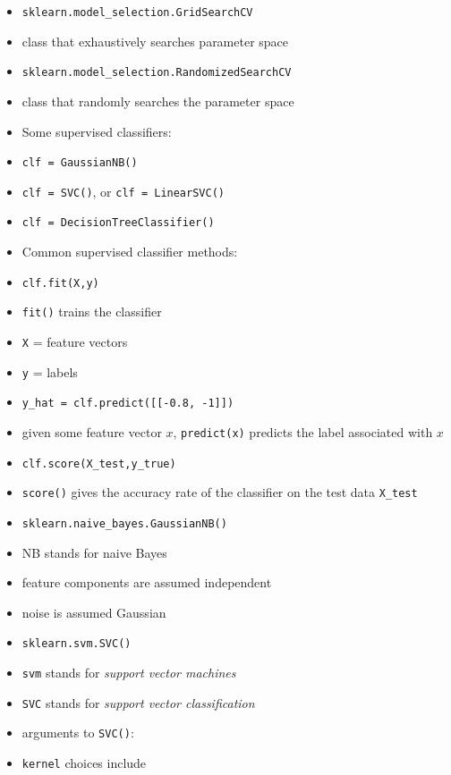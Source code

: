 \documentclass[onecolumn]{IEEEtran} %
\begin{document}
\begin{itemize}
        \ei
        \item \verb|sklearn.model_selection.GridSearchCV|
        \bi
            \item class that exhaustively searches parameter space
        \ei
        \item \verb|sklearn.model_selection.RandomizedSearchCV|
        \bi
            \item class that randomly searches the parameter space
        \ei
    \ei
    \item Some supervised classifiers:
    \bi
        \item \verb|clf = GaussianNB()|
        \item \verb|clf = SVC()|, or \verb|clf = LinearSVC()|
        \item \verb|clf = DecisionTreeClassifier()|
    \ei
    \item Common supervised classifier methods:
    \bi
        \item \verb|clf.fit(X,y)|
        \bi
            \item \verb|fit()| trains the classifier
            \item \verb|X| = feature vectors
            \item \verb|y| = labels
        \ei
        \item \verb|y_hat = clf.predict([[-0.8, -1]])|
        \bi
            \item given some feature vector $x$, \verb|predict(x)| predicts the label associated with $x$
        \ei
        \item \verb|clf.score(X_test,y_true)|
        \bi
            \item \verb|score()| gives the accuracy rate of the classifier on the test data \verb|X_test|
        \ei
    \ei
    \item \verb|sklearn.naive_bayes.GaussianNB()|
    \bi
        \item NB stands for naive Bayes
        \item feature components are assumed independent
        \item noise is assumed Gaussian
    \ei
    \item \verb|sklearn.svm.SVC()|
    \bi
        \item \verb|svm| stands for \emph{support vector machines}
        \item \verb|SVC| stands for \emph{support vector classification}
        \item arguments to \verb|SVC()|:
        \bi
            \item \verb|kernel| choices include

\end{itemize}
\end{document}
